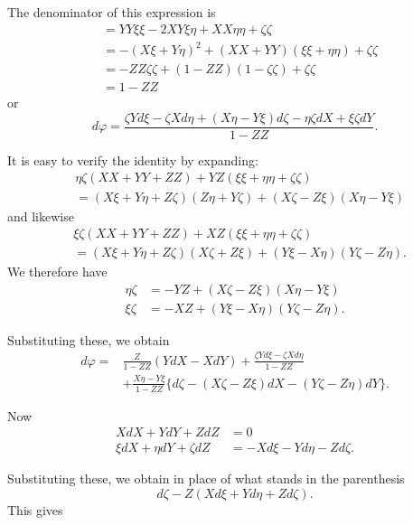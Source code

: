 %
The denominator of this expression is
\[
\begin{aligned}
&=YY\xi\xi-2XY\xi\eta+XX\eta\eta+\zeta\zeta\\
&=-(X\xi+Y\eta)^{2}+(XX+YY)(\xi\xi+\eta\eta)+\zeta\zeta\\
&=-ZZ\zeta\zeta+(1-ZZ)(1-\zeta\zeta)+\zeta\zeta\\
&=1-ZZ
\end{aligned}
\]
or
\[
d\varphi=\frac{\zeta Yd\xi-\zeta Xd\eta+(X\eta-Y\xi)d\zeta-\eta\zeta dX+\xi\zeta dY}{1-ZZ}.
\]

It is easy to verify the identity by expanding:
\[
\begin{aligned}
&\eta\zeta(XX+YY+ZZ)+YZ(\xi\xi+\eta\eta+\zeta\zeta)\\
&=(X\xi+Y\eta+Z\zeta)(Z\eta+Y\zeta)+(X\zeta-Z\xi)(X\eta-Y\xi)
\end{aligned}
\]
and likewise
\[
\begin{aligned}
&\xi\zeta(XX+YY+ZZ)+XZ(\xi\xi+\eta\eta+\zeta\zeta)\\
&=(X\xi+Y\eta+Z\zeta)(X\zeta+Z\xi)+(Y\xi-X\eta)(Y\zeta-Z\eta).
\end{aligned}
\]
We therefore have
\[
\begin{aligned}
\eta\zeta&=-YZ+(X\zeta-Z\xi)(X\eta-Y\xi)\\
\xi\zeta&=-XZ+(Y\xi-X\eta)(Y\zeta-Z\eta).
\end{aligned}
\]

Substituting these, we obtain
\[
\begin{aligned}
d\varphi={}&\frac{Z}{1-ZZ}(YdX-XdY)+\frac{\zeta Yd\xi-\zeta Xd\eta}{1-ZZ}\\
&+\frac{X\eta-Y\xi}{1-ZZ}\{d\zeta-(X\zeta-Z\xi)dX-(Y\zeta-Z\eta)dY\}.
\end{aligned}
\]

Now
\[
\begin{aligned}
XdX+YdY+ZdZ&=0\\
\xi dX+\eta dY+\zeta dZ&=-Xd\xi-Yd\eta-Zd\zeta.
\end{aligned}
\]

Substituting these, we obtain in place of what stands in the parenthesis
\[
d\zeta-Z(Xd\xi+Yd\eta+Zd\zeta).
\]
This gives
